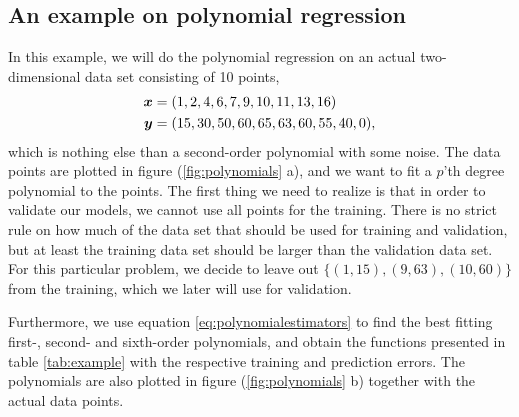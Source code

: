 \subsection{An example on polynomial regression} \label{sec:example}
In this example, we will do the polynomial regression on an actual two-dimensional data set consisting of 10 points,
\begin{align}
\boldsymbol{{x}}&=(1,2,4,6,7,9,10,11,13,16)\notag\\
\boldsymbol{{y}}&=(15,30,50,60,65,63,60,55,40,0),
\label{eq:datapoints}
\end{align}
which is nothing else than a second-order polynomial with some noise. The data points are plotted in figure (\ref{fig:polynomials} a), and we want to fit a $p$'th degree polynomial to the points. The first thing we need to realize is that in order to validate our models, we cannot use all points for the training. There is no strict rule on how much of the data set that should be used for training and validation, but at least the training data set should be larger than the validation data set. For this particular problem, we decide to leave out $\{(1,15),(9,63),(10,60)\}$ from the training, which we later will use for validation.

Furthermore, we use equation \eqref{eq:polynomialestimators} to find the best fitting first-, second- and sixth-order polynomials, and obtain the functions presented in table \eqref{tab:example} with the respective training and prediction errors. The polynomials are also plotted in figure (\ref{fig:polynomials} b) together with the actual data points.

